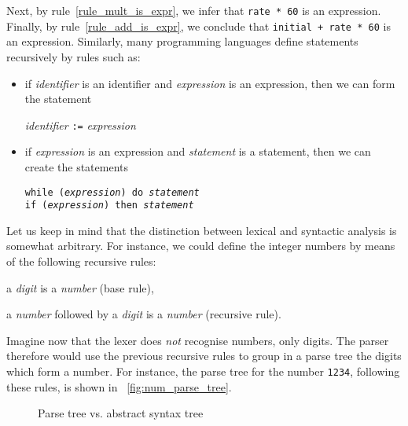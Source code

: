 Next, by rule~\ref{rule_mult_is_expr}, we infer that \texttt{rate *
60} is an expression. Finally, by rule~\ref{rule_add_is_expr}, we
conclude that \texttt{initial + rate * 60} is an
expression. Similarly, many programming languages define statements
recursively by rules such as:
\begin{itemize}

  \item if \emph{identifier} is an identifier and
    \emph{expression} is an expression, then we can form the statement
    \begin{center}
      \emph{identifier} \texttt{:=} \emph{expression}
    \end{center}

  \item if \emph{expression} is an expression and \emph{statement} is
    a statement, then we can create the statements
    \begin{center}
     \tt while (\emph{expression}) do \emph{statement}\\
     if (\emph{expression}) then \emph{statement}
    \end{center}

\end{itemize}
Let us keep in mind that the distinction between lexical and syntactic
analysis is somewhat arbitrary. For instance, we could define the
integer numbers by means of the following recursive rules:
\begin{itemize*}

  \item a \emph{digit} is a \emph{number} (base rule),

  \item a \emph{number} followed by a \emph{digit} is a
  \emph{number} (recursive rule).

\end{itemize*}
Imagine now that the lexer does \emph{not} recognise numbers, only
digits. The parser therefore would use the previous recursive rules to
group in a parse tree the digits which form a number. For instance,
the parse tree for the number \texttt{1234}, following these rules, is
shown in \fig~\vref{fig:num_parse_tree}.
\begin{figure}
\centering
{}
\quad
{}
\caption{Parse tree vs. abstract syntax tree}
\end{figure}
